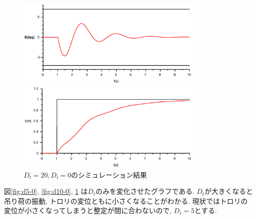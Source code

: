 \documentclass[titlepage]{jsarticle}
\begin{document}
            \begin{figure}[h]
                \begin{minipage}{0.5\hsize}
                    \centering
                    \includegraphics[width=9cm]{img/D20-0t.eps}
                \end{minipage}
                \begin{minipage}{0.5\hsize}
                    \centering
                    \includegraphics[width=9cm]{img/D20-0x.eps}
                \end{minipage}
                \caption{$D_t = 20, D_l = 0$のシミュレーション結果}
                \label{fig:d20-0}
            \end{figure}

            図\ref{fig:d5-0}, \ref{fig:d10-0}, \ref{fig:d20-0}
            は$D_t$のみを変化させたグラフである.
            $D_t$が大きくなると吊り荷の振動,
            トロリの変位ともに小さくなることがわかる.
            現状ではトロリの変位が小さくなってしまうと整定が間に合わないので,
            $D_t = 5$とする.
\end{document}
